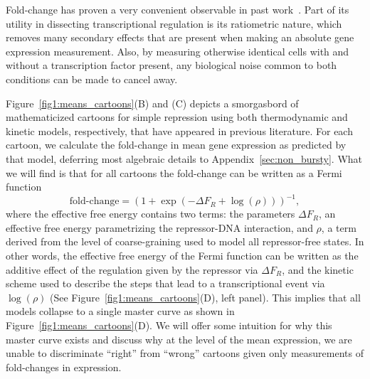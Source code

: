 Fold-change has proven a very convenient observable in past
work~\cite{Garcia2011a, Brewster2014, Razo-Mejia2018, Chure2019}. Part of its
utility in dissecting transcriptional regulation is its ratiometric nature,
which removes many secondary effects that are present when making an absolute
gene expression measurement. Also, by measuring otherwise identical cells with
and without a transcription factor present, any biological noise common to both
conditions can be made to cancel away.

Figure~\ref{fig1:means_cartoons}(B) and (C) depicts a smorgasbord of
mathematicized cartoons for simple repression using both thermodynamic and
kinetic models, respectively, that have appeared in previous literature. For
each cartoon, we calculate the fold-change in mean gene expression as predicted
by that model, deferring most algebraic details to
Appendix~\ref{sec:non_bursty}. What we will find is that for all cartoons the
fold-change can be written as a Fermi function 
\begin{equation}
 \text{fold-change} = \left( 1 + \exp(-\Delta F_R + \log(\rho))  \right)^{-1},
 \label{eq:deltaFR_eq_noneq_equiv}
\end{equation}
where the effective free energy contains two terms: the parameters $\Delta F_R$,
an effective free energy parametrizing the repressor-DNA interaction, and
$\rho$, a term derived from the level of coarse-graining used to model all
repressor-free states. In other words, the effective free energy of the Fermi
function can be written as the additive effect of the regulation given by the
repressor via $\Delta F_R$, and the kinetic scheme used to describe the steps
that lead to a transcriptional event via $\log(\rho)$ (See
Figure~\ref{fig1:means_cartoons}(D), left panel). This implies that all models
collapse to a single master curve as shown in
Figure~\ref{fig1:means_cartoons}(D). We will offer some intuition for why this
master curve exists and discuss why at the level of the mean expression, we are
unable to discriminate ``right'' from ``wrong'' cartoons given only measurements
of fold-changes in expression.

